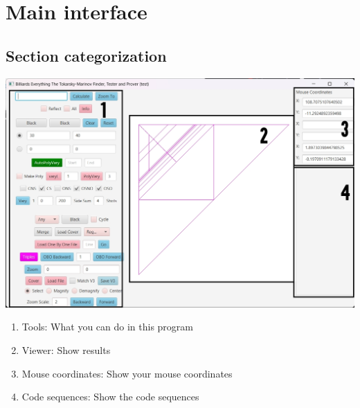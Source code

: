 \documentclass[11pt]{report}
\begin{document}
\section{Main interface}
\subsection{Section categorization}
\includegraphics[scale = 0.38]{main_interface}
\begin{enumerate}[1 -]
  \item Tools: What you can do in this program
  \item Viewer: Show results
  \item Mouse coordinates: Show your mouse coordinates
  \item Code sequences: Show the code sequences
\end{enumerate}
\end{document}
